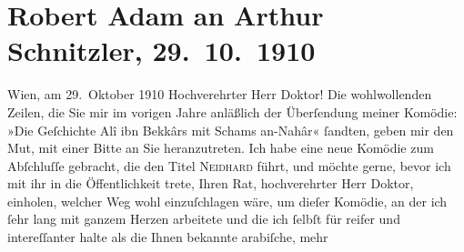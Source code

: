 

         \renewcommand{\erwaehnteOrte}{Orte: Meidlinger Hauptstraße, Wien}
         \renewcommand{\erwaehnteWerke}{Werke: Die Geschichte des Alî ibn Bekkâr mit Schams an-Nahâr, Neidhard}
               \section[Robert Adam an Arthur Schnitzler, 29. 10. 1910]{ Robert Adam an Arthur Schnitzler, 29. 10. 1910}\nopagebreak{}\rehead{ }\begin{ledgroupsized}[t]{13cm}\normalsize\beginnumbering \toendnotes[C]{\smallbreak\pagebreak[2]} 
\toendnotes[C]{\smallbreak}\pstart
           \raggedleft{}{\pb}Wien, am 29. Oktober 1910\pend
           \pstart{}Hochverehrter Herr Doktor!\pend\pstart
           Die wohlwollenden Zeilen, die Sie mir im vorigen Jahre anläßlich der Überſendung
               meiner Komödie: »Die Geſchichte Alî ibn Bekkârs mit
                  Schams an-Nahâr« ſandten, geben mir den Mut, mit einer Bitte an Sie
               heranzutreten.\pend
           \pstart
           Ich habe eine neue Komödie zum Abſchluſſe gebracht, die den Titel \textsc{Neidhard} führt, und möchte gerne, bevor ich mit ihr in die Öffentlichkeit trete, {\pb}Ihren Rat, hochverehrter Herr Doktor, einholen,
               welcher Weg wohl einzuſchlagen wäre, um dieſer Komödie, an der ich ſehr lang mit
               ganzem Herzen arbeitete und die ich ſelbſt für reifer und intereſſanter halte als die
               Ihnen bekannte arabiſche, mehr

\end{ledgroupsized}
